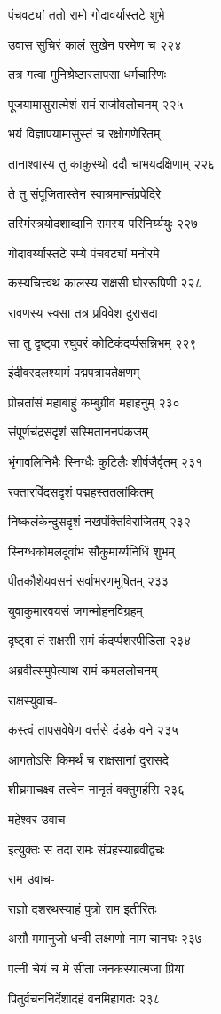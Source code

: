 पंचवट्यां ततो रामो गोदावर्यास्तटे शुभे

उवास सुचिरं कालं सुखेन परमेण च २२४

तत्र गत्वा मुनिश्रेष्ठास्तापसा धर्मचारिणः

पूजयामासुरात्मेशं रामं राजीवलोचनम् २२५

भयं विज्ञापयामासुस्तं च रक्षोगणेरितम्

तानाश्वास्य तु काकुस्थो ददौ चाभयदक्षिणाम् २२६

ते तु संपूजितास्तेन स्वाश्रमान्संप्रपेदिरे

तस्मिंस्त्रयोदशाब्दानि रामस्य परिनिर्य्ययुः २२७

गोदावर्य्यास्तटे रम्ये पंचवट्यां मनोरमे

कस्यचित्त्वथ कालस्य राक्षसी घोररूपिणी २२८

रावणस्य स्वसा तत्र प्रविवेश दुरासदा

सा तु दृष्ट्वा रघुवरं कोटिकंदर्प्पसन्निभम् २२९

इंदीवरदलश्यामं पद्मपत्रायतेक्षणम्

प्रोन्नतांसं महाबाहुं कम्बुग्रीवं महाहनुम् २३०

संपूर्णचंद्रसदृशं सस्मिताननपंकजम्

भृंगावलिनिभैः स्निग्धैः कुटिलैः शीर्षजैर्वृतम् २३१

रक्तारविंदसदृशं पद्महस्ततलांकितम्

निष्कलंकेन्दुसदृशं नखपंक्तिविराजितम् २३२

स्निग्धकोमलदूर्वाभं सौकुमार्य्यनिधिं शुभम्

पीतकौशेयवसनं सर्वाभरणभूषितम् २३३

युवाकुमारवयसं जगन्मोहनविग्रहम्

दृष्ट्वा तं राक्षसी रामं कंदर्प्पशरपीडिता २३४

अब्रवीत्समुपेत्याथ रामं कमललोचनम्

राक्षस्युवाच-

कस्त्वं तापसवेषेण वर्त्तसे दंडके वने २३५

आगतोऽसि किमर्थं च राक्षसानां दुरासदे

शीघ्रमाचक्ष्व तत्त्वेन नानृतं वक्तुमर्हसि २३६

महेश्वर उवाच-

इत्युक्तः स तदा रामः संप्रहस्याब्रवीद्वचः

राम उवाच-

राज्ञो दशरथस्याहं पुत्रो राम इतीरितः

असौ ममानुजो धन्वी लक्ष्मणो नाम चानघः २३७

पत्नी चेयं च मे सीता जनकस्यात्मजा प्रिया

पितुर्वचननिर्देशादहं वनमिहागतः २३८

